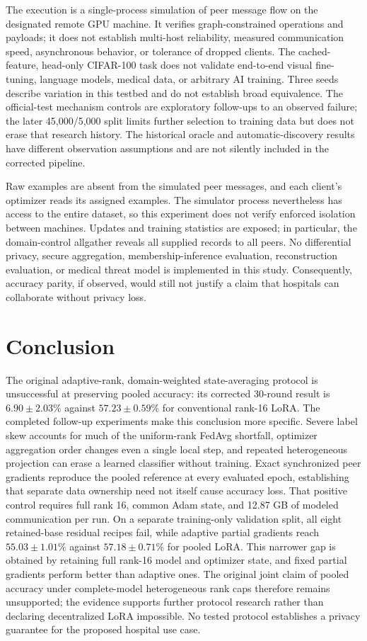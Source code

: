 \documentclass[11pt]{article}
\begin{document}
The execution is a single-process simulation of peer message flow on the designated remote GPU machine. It verifies graph-constrained operations and payloads; it does not establish multi-host reliability, measured communication speed, asynchronous behavior, or tolerance of dropped clients. The cached-feature, head-only CIFAR-100 task does not validate end-to-end visual fine-tuning, language models, medical data, or arbitrary AI training. Three seeds describe variation in this testbed and do not establish broad equivalence. The official-test mechanism controls are exploratory follow-ups to an observed failure; the later 45,000/5,000 split limits further selection to training data but does not erase that research history. The historical oracle and automatic-discovery results have different observation assumptions and are not silently included in the corrected pipeline.

Raw examples are absent from the simulated peer messages, and each client's optimizer reads its assigned examples. The simulator process nevertheless has access to the entire dataset, so this experiment does not verify enforced isolation between machines. Updates and training statistics are exposed; in particular, the domain-control allgather reveals all supplied records to all peers. No differential privacy, secure aggregation, membership-inference evaluation, reconstruction evaluation, or medical threat model is implemented in this study. Consequently, accuracy parity, if observed, would still not justify a claim that hospitals can collaborate without privacy loss.

\section{Conclusion}
The original adaptive-rank, domain-weighted state-averaging protocol is unsuccessful at preserving pooled accuracy: its corrected 30-round result is $6.90\pm2.03\%$ against $57.23\pm0.59\%$ for conventional rank-16 LoRA. The completed follow-up experiments make this conclusion more specific. Severe label skew accounts for much of the uniform-rank FedAvg shortfall, optimizer aggregation order changes even a single local step, and repeated heterogeneous projection can erase a learned classifier without training. Exact synchronized peer gradients reproduce the pooled reference at every evaluated epoch, establishing that separate data ownership need not itself cause accuracy loss. That positive control requires full rank 16, common Adam state, and 12.87 GB of modeled communication per run. On a separate training-only validation split, all eight retained-base residual recipes fail, while adaptive partial gradients reach $55.03\pm1.01\%$ against $57.18\pm0.71\%$ for pooled LoRA. This narrower gap is obtained by retaining full rank-16 model and optimizer state, and fixed partial gradients perform better than adaptive ones. The original joint claim of pooled accuracy under complete-model heterogeneous rank caps therefore remains unsupported; the evidence supports further protocol research rather than declaring decentralized LoRA impossible. No tested protocol establishes a privacy guarantee for the proposed hospital use case.
\end{document}
